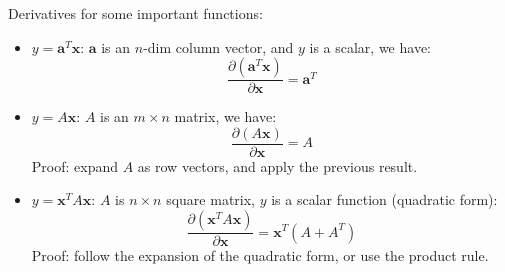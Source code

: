 \documentclass{report}
\begin{document}
Derivatives for some important functions: 
\begin{itemize}
\item $y = \mathbf{a}^T \mathbf{x}$: $\mathbf{a}$ is an $n$-dim column vector, and $y$ is a scalar, we have: 
\begin{equation}
\frac{\partial (\mathbf{a}^T \mathbf{x})}{\partial \mathbf{x}} = \mathbf{a}^T
\end{equation}

\item $y = A \mathbf{x}$: $A$ is an $m \times n$ matrix, we have: 
\begin{equation}
\frac{\partial (A \mathbf{x})}{\partial \mathbf{x}} = A
\end{equation}
Proof: expand $A$ as row vectors, and apply the previous result. 

 
\item $y = \mathbf{x}^T A \mathbf{x}$: $A$ is $n \times n$ square matrix, $y$ is a scalar function (quadratic form): 
\begin{equation}
\frac{\partial (\mathbf{x}^T A \mathbf{x})}{\partial \mathbf{x}} = \mathbf{x}^T (A + A^T) 
\end{equation}
Proof: follow the expansion of the quadratic form, or use the product rule. 
\end{itemize}
 
\end{document}
